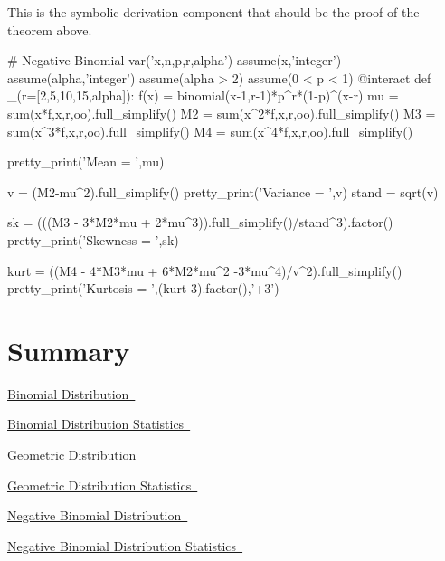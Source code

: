 \documentclass[10pt,]{book}
\numberwithin{equation}{section}
\begin{document}
%
\par
\hypertarget{p-917}{}%
This is the symbolic derivation component that should be the proof of the theorem above.%
\begin{sageinput}
# Negative Binomial
var('x,n,p,r,alpha')
assume(x,'integer')
assume(alpha,'integer')
assume(alpha > 2)
assume(0 < p < 1)
@interact
def _(r=[2,5,10,15,alpha]):
    f(x) = binomial(x-1,r-1)*p^r*(1-p)^(x-r)
    mu = sum(x*f,x,r,oo).full_simplify()
    M2 = sum(x^2*f,x,r,oo).full_simplify()
    M3 = sum(x^3*f,x,r,oo).full_simplify()
    M4 = sum(x^4*f,x,r,oo).full_simplify()
        
    pretty_print('Mean = ',mu)
    
    v = (M2-mu^2).full_simplify()
    pretty_print('Variance = ',v)
    stand = sqrt(v)
    
    sk = (((M3 - 3*M2*mu + 2*mu^3)).full_simplify()/stand^3).factor()
    pretty_print('Skewness = ',sk)
    
    kurt = ((M4 - 4*M3*mu + 6*M2*mu^2 -3*mu^4)/v^2).full_simplify()
    pretty_print('Kurtosis = ',(kurt-3).factor(),'+3')
\end{sageinput}
%
%
\typeout{************************************************}
\typeout{************************************************}
%
\section[{Summary}]{Summary}\label{section-49}
\hypertarget{p-918}{}%
\hyperlink{BinomialProbabilityFunction}{Binomial Distribution~}%
\par
\hypertarget{p-919}{}%
\hyperlink{BinomialStatistics}{Binomial Distribution Statistics~}%
\par
\hypertarget{p-920}{}%
\hyperlink{GeometricProbabilityFunction}{Geometric Distribution~}%
\par
\hypertarget{p-921}{}%
\hyperlink{GeometricStatistics}{Geometric Distribution Statistics~}%
\par
\hypertarget{p-922}{}%
\hyperlink{NegativeBinomialProbabilityFunction}{Negative Binomial Distribution~}%
\par
\hypertarget{p-923}{}%
\hyperlink{NegativeBinomialStatistics}{Negative Binomial Distribution Statistics~}%
%
%
\typeout{************************************************}
\typeout{************************************************}
%
\end{document}
